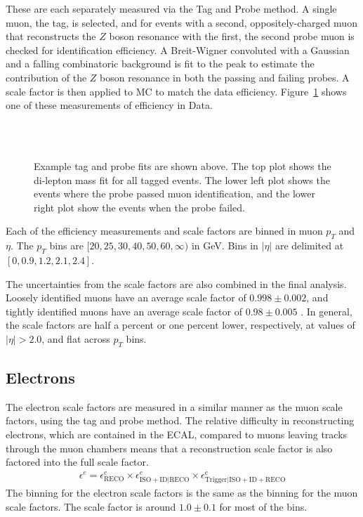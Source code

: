 These are each separately measured via the Tag and Probe method.
A single muon, the tag, is selected, and for events with a second, oppositely-charged muon
that reconstructs the $Z$ boson resonance with the first,
the second probe muon is checked for identification efficiency.
A Breit-Wigner convoluted with a Gaussian and a falling combinatoric background
is fit to the peak to estimate the contribution
of the $Z$ boson resonance in both the passing and failing probes.
A scale factor is then applied to MC to match the data efficiency.
Figure~\ref{fig:muon-tag-probe} shows one of these measurements of efficiency in Data.
\begin{figure}
  \centering
   \\
  ~
  \caption[Tag and probe fits]{
    Example tag and probe fits are shown above.
    The top plot shows the di-lepton mass fit for all tagged events.
    The lower left plot shows the events where the probe passed muon identification,
    and the lower right plot show the events when the probe failed.
    }
  \label{fig:muon-tag-probe}
\end{figure}
Each of the efficiency measurements and scale factors are binned
in muon $p_T$ and $\eta$.
The $p_T$ bins are $[20, 25, 30, 40, 50, 60, \infty)$ in GeV.
Bins in $|\eta|$ are delimited at $[0, 0.9, 1.2, 2.1, 2.4]$.

The uncertainties from the scale factors are also combined in the final analysis.
Loosely identified muons have an average scale factor of $0.998\pm0.002$,
and tightly identified muons have an average scale factor of $0.98\pm0.005$
\cite{CMS-DP-2019-022}.
In general, the scale factors are half a percent or one percent lower, respectively,
at values of $|\eta| > 2.0$, and flat across $p_T$ bins.

\subsection{Electrons}

The electron scale factors are measured in a similar manner as the muon scale factors,
using the tag and probe method.
The relative difficulty in reconstructing electrons, which are contained in the ECAL,
compared to muons leaving tracks through the muon chambers
means that a reconstruction scale factor is also factored into the full scale factor.
\begin{gather}
  \epsilon^e = \epsilon^e_\mathrm{RECO} \times \epsilon^e_\mathrm{ISO + ID|RECO} \times \epsilon^e_\mathrm{Trigger|ISO + ID + RECO}
\end{gather}
The binning for the electron scale factors is the same as the binning
for the muon scale factors.
The scale factor is around $1.0 \pm 0.1$ for most of the bins.

